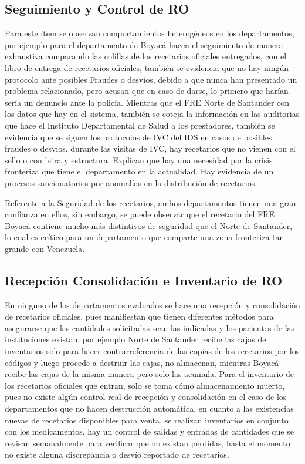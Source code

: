 \documentclass[
]{book}
\begin{document}
\hypertarget{seguimiento-y-control-de-ro}{%
\subsection{Seguimiento y Control de RO}\label{seguimiento-y-control-de-ro}}

Para este ítem se observan comportamientos heterogéneos en los departamentos, por ejemplo para el departamento de Boyacá hacen el seguimiento de manera exhaustiva comparando las colillas de los recetarios oficiales entregados, con el libro de entrega de recetarios oficiales, también se evidencia que no hay ningún protocolo ante posibles Fraudes o desvíos, debido a que nunca han presentado un problema relacionado, pero acusan que en caso de darse, lo primero que harían sería un denuncio ante la policía. Mientras que el FRE Norte de Santander con los datos que hay en el sistema, también se coteja la información en las auditorias que hace el Instituto Departamental de Salud a los prestadores, también se evidencia que se siguen los protocolos de IVC del IDS en casos de posibles fraudes o desvíos, durante las visitas de IVC, hay recetarios que no vienen con el sello o con letra y estructura. Explican que hay una necesidad por la crisis fronteriza que tiene el departamento en la actualidad. Hay evidencia de un procesos sancionatorios por anomalías en la distribución de recetarios.

Referente a la Seguridad de los recetarios, ambos departamentos tienen una gran confianza en ellos, sin embargo, se puede observar que el recetario del FRE Boyacá contiene mucho más distintivos de seguridad que el Norte de Santander, lo cual es crítico para un departamento que comparte una zona fronteriza tan grande con Venezuela.

\hypertarget{recepciuxf3n-consolidaciuxf3n-e-inventario-de-ro}{%
\subsection{Recepción Consolidación e Inventario de RO}\label{recepciuxf3n-consolidaciuxf3n-e-inventario-de-ro}}

En ninguno de los departamentos evaluados se hace una recepción y consolidación de recetarios oficiales, pues manifiestan que tienen diferentes métodos para asegurarse que las cantidades solicitadas sean las indicadas y los pacientes de las instituciones existan, por ejemplo Norte de Santander recibe las cajas de inventarios solo para hacer contrarreferencia de las copias de los recetarios por los códigos y luego procede a destruir las cajas, no almacenan, mientras Boyacá recibe las cajas de la misma manera pero solo las acumula. Para el inventario de los recetarios oficiales que entran, solo se toma cómo almacenamiento muerto, pues no existe algún control real de recepción y consolidación en el caso de los departamentos que no hacen destrucción automática. en cuanto a las existencias nuevas de recetarios disponibles para venta, se realizan inventarios en conjunto con los medicamentos, hay un control de salidas y entradas de cantidades que se revisan semanalmente para verificar que no existan pérdidas, hasta el momento no existe alguna discrepancia o desvío reportado de recetarios.
\end{document}
